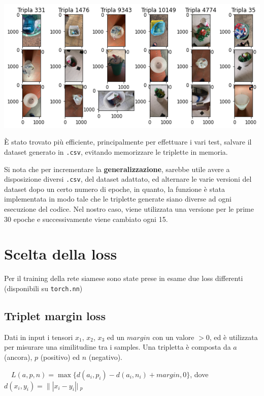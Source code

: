 \documentclass[11pt]{article}
\begin{document}
\begin{center}
    \begin{minipage}{0.6\linewidth}
    \includegraphics[width=\linewidth]{triplet_dataset.png}
    \end{minipage}
\end{center}

È stato trovato più efficiente, principalmente per effettuare i vari test, salvare il dataset generato in
\texttt{.csv}, evitando memorizzare le triplette in memoria. 

Si nota che per incrementare la \textbf{generalizzazione}, sarebbe utile avere a disposizione diversi
\texttt{.csv}, del dataset adattato, ed alternare le varie versioni del dataset dopo un certo numero di epoche, 
in quanto, la funzione è stata implementata in modo tale che le triplette generate siano diverse ad ogni esecuzione del codice. Nel nostro caso, viene utilizzata
una versione per le prime 30 epoche e successivamente viene cambiato ogni 15.

\section{Scelta della loss}

Per il training della rete siamese sono state prese in esame due loss differenti (disponibili su \texttt{torch.nn})

\subsection{Triplet margin loss}
Dati in input i tensori $x_1$, $x_2$, $x_3$ ed un $margin$ con un valore $> 0$, ed è
utilizzata per misurare una similitudine tra i samples.
Una tripletta è composta da $a$ (ancora), $p$ (positivo) ed $n$ (negativo). 
\begin{center}
    \ \
    $L(a,p,n) = \max{ \{ d(a_i, p_i) - d(a_i, n_i) + margin, 0 \} }$, dove \ \
    \\
    $d(x_i, y_i) = \|| x_i - y_i ||\ _p$
    \ \
\end{center}
\end{document}
